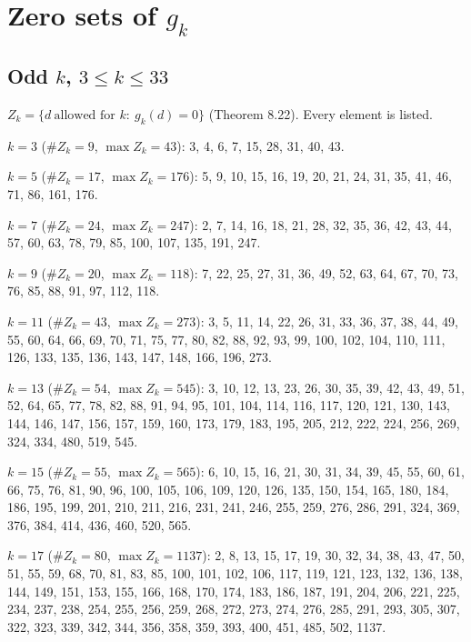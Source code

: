 \section{\texorpdfstring{Zero sets of \(g_k\)}{Zero sets of g\_k}}\label{zero-sets-of-g_k}

\subsection{\texorpdfstring{Odd \(k\), \(3\le k\le33\)}{Odd k, 3\textbackslash le k\textbackslash le33}}\label{odd-k-3le-kle33}

\(Z_k=\{d\ \text{allowed for }k:\ g_k(d)=0\}\) (Theorem 8.22). Every element is listed.

\textbf{\(k=3\)} (\(\#Z_k=9\), \(\max Z_k=43\)): 3, 4, 6, 7, 15, 28, 31, 40, 43.

\textbf{\(k=5\)} (\(\#Z_k=17\), \(\max Z_k=176\)): 5, 9, 10, 15, 16, 19, 20, 21, 24, 31, 35, 41, 46, 71, 86, 161, 176.

\textbf{\(k=7\)} (\(\#Z_k=24\), \(\max Z_k=247\)): 2, 7, 14, 16, 18, 21, 28, 32, 35, 36, 42, 43, 44, 57, 60, 63, 78, 79, 85, 100, 107, 135, 191, 247.

\textbf{\(k=9\)} (\(\#Z_k=20\), \(\max Z_k=118\)): 7, 22, 25, 27, 31, 36, 49, 52, 63, 64, 67, 70, 73, 76, 85, 88, 91, 97, 112, 118.

\textbf{\(k=11\)} (\(\#Z_k=43\), \(\max Z_k=273\)): 3, 5, 11, 14, 22, 26, 31, 33, 36, 37, 38, 44, 49, 55, 60, 64, 66, 69, 70, 71, 75, 77, 80, 82, 88, 92, 93, 99, 100, 102, 104, 110, 111, 126, 133, 135, 136, 143, 147, 148, 166, 196, 273.

\textbf{\(k=13\)} (\(\#Z_k=54\), \(\max Z_k=545\)): 3, 10, 12, 13, 23, 26, 30, 35, 39, 42, 43, 49, 51, 52, 64, 65, 77, 78, 82, 88, 91, 94, 95, 101, 104, 114, 116, 117, 120, 121, 130, 143, 144, 146, 147, 156, 157, 159, 160, 173, 179, 183, 195, 205, 212, 222, 224, 256, 269, 324, 334, 480, 519, 545.

\textbf{\(k=15\)} (\(\#Z_k=55\), \(\max Z_k=565\)): 6, 10, 15, 16, 21, 30, 31, 34, 39, 45, 55, 60, 61, 66, 75, 76, 81, 90, 96, 100, 105, 106, 109, 120, 126, 135, 150, 154, 165, 180, 184, 186, 195, 199, 201, 210, 211, 216, 231, 241, 246, 255, 259, 276, 286, 291, 324, 369, 376, 384, 414, 436, 460, 520, 565.

\textbf{\(k=17\)} (\(\#Z_k=80\), \(\max Z_k=1137\)): 2, 8, 13, 15, 17, 19, 30, 32, 34, 38, 43, 47, 50, 51, 55, 59, 68, 70, 81, 83, 85, 100, 101, 102, 106, 117, 119, 121, 123, 132, 136, 138, 144, 149, 151, 153, 155, 166, 168, 170, 174, 183, 186, 187, 191, 204, 206, 221, 225, 234, 237, 238, 254, 255, 256, 259, 268, 272, 273, 274, 276, 285, 291, 293, 305, 307, 322, 323, 339, 342, 344, 356, 358, 359, 393, 400, 451, 485, 502, 1137.

